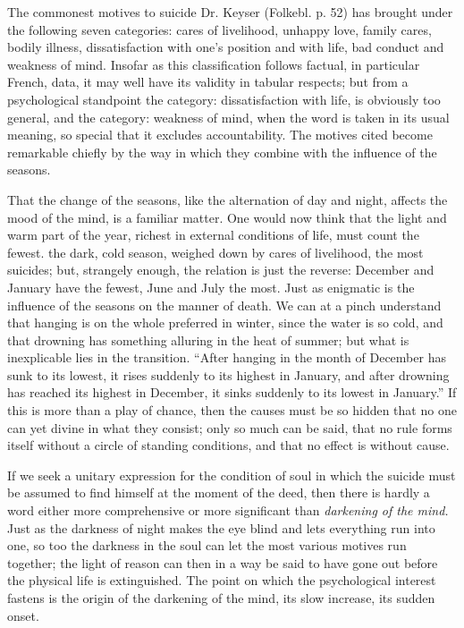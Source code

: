 \documentclass[12pt,a4paper,openany]{book}
\newcommand{\opage}[1]{\marginnote{\footnotesize\textit{[#1]}}}
\begin{document}
The commonest motives to suicide Dr. Keyser (Folkebl. p. 52) has brought under the following seven categories: cares of livelihood, unhappy love, family cares, bodily illness, dissatisfaction with one's position and with life, bad conduct and weakness of mind. Insofar as this classification follows factual, in particular French, data, it may well have its validity in tabular respects; but from a psychological standpoint the category: dissatisfaction with life, is obviously too general, and the category: weakness of mind, when the word is taken in its usual meaning, so special that it excludes accountability. The motives cited become remarkable chiefly by the way in which they combine with the influence of the seasons.

That the change of the seasons, like the alternation of day and night, affects the mood of the mind, is a
\setcounter{footnote}{0}%
\opage{697}familiar matter. One would now think that the light and warm part of the year, richest in external conditions of life, must count the fewest. the dark, cold season, weighed down by cares of livelihood, the most suicides; but, strangely enough, the relation is just the reverse: %
December and January have the fewest, June and July the most. Just as enigmatic is the influence of the seasons on the manner of death. We can at a pinch understand that hanging is on the whole preferred in winter, since the water is so cold, and that drowning has something alluring in the heat of summer; but what is inexplicable lies in the transition. ``After hanging in the month of December has sunk to its lowest, it rises suddenly to its highest in January, and after drowning has reached its highest in December, it sinks suddenly to its lowest in January.'' If this is more than a play of chance, then the causes must be so hidden that no one can yet divine in what they consist; only so much can be said, that no rule forms itself without a circle of standing conditions, and that no effect is without cause.

If we seek a unitary expression for the condition of soul in which the suicide must be assumed to find himself at the moment of the deed, then there is hardly a word either more comprehensive or more significant than \emph{darkening of the mind.} Just as the darkness of night makes the eye blind and lets everything run into one, so too the darkness in the soul can let the most various motives run together; the light of reason can then in a way be said to have gone out before the physical life is extinguished. The point on which the psychological interest fastens
\setcounter{footnote}{0}%
\opage{698}is the origin of the darkening of the mind, its slow increase, its sudden onset.
\end{document}
